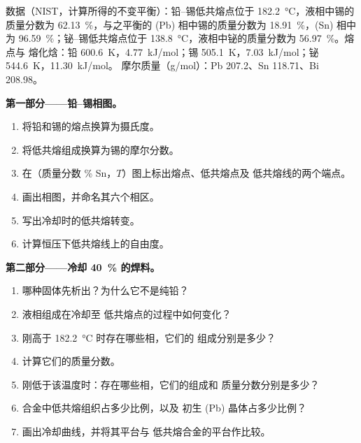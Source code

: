 \begin{problem}
\label{pb:b2:solid-liquid-diagrams:1}
数据（NIST，计算所得的不变平衡）：铅–锡低共熔点位于
\qty{182.2}{\degreeCelsius}，液相中锡的质量分数为 62.13~\%，与之平衡的
(Pb) 相中锡的质量分数为 18.91~\%，(Sn) 相中为 96.59~\%；铋–锡低共熔点位于
\qty{138.8}{\degreeCelsius}，液相中铋的质量分数为 56.97~\%。熔点与
熔化焓：铅 \qty{600.6}{K}，\qty{4.77}{kJ/mol}；锡
\qty{505.1}{K}，\qty{7.03}{kJ/mol}；铋 \qty{544.6}{K}，\qty{11.30}{kJ/mol}。
摩尔质量（\unit{g/mol}）：Pb 207.2、Sn 118.71、Bi 208.98。

\medskip
\noindent\textbf{第一部分——铅–锡相图。}
\begin{enumerate}
  \item 将铅和锡的熔点换算为摄氏度。
  \item 将低共熔组成换算为锡的摩尔分数。
  \item 在（质量分数 \% Sn，$T$）图上标出熔点、低共熔点及
        低共熔线的两个端点。
  \item 画出相图，并命名其六个相区。
  \item 写出冷却时的低共熔转变。
  \item 计算恒压下低共熔线上的自由度。
\end{enumerate}

\medskip
\noindent\textbf{第二部分——冷却 40~\% 的焊料。}
\begin{enumerate}[resume]
  \item 哪种固体先析出？为什么它不是纯铅？
  \item 液相组成在冷却至
        低共熔点的过程中如何变化？
  \item 刚高于 \qty{182.2}{\degreeCelsius} 时存在哪些相，它们的
        组成分别是多少？
  \item 计算它们的质量分数。
  \item 刚低于该温度时：存在哪些相，它们的组成和
        质量分数分别是多少？
  \item 合金中低共熔组织占多少比例，以及
        初生 (Pb) 晶体占多少比例？
  \item 画出冷却曲线，并将其平台与
        低共熔合金的平台作比较。
\end{enumerate}


\end{problem}
